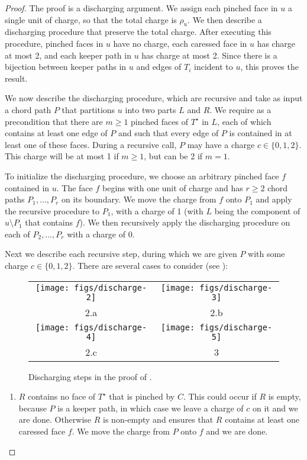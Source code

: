 \documentclass{patmorin}
\newcommand{\dual}[1]{{#1}^\star}
\begin{document}
\begin{proof}
   The proof is a discharging argument.  We assign each pinched face in 
   $u$ a single unit of charge, so that the total charge is $\rho_u$.
   We then describe a discharging procedure that preserve the total
   charge.  After executing this procedure, pinched faces in $u$
   have no charge, each caressed face in $u$ has charge at most 2,
   and each keeper path in $u$ has charge at most 2.  Since there is a
   bijection between keeper paths in $u$ and edges of $T_i$ incident to
   $u$, this proves the result.

   We now describe the discharging procedure, which are recursive and take as
   input a chord path $P$ that partitions $u$ into two parts $L$ and $R$.
   We require as a precondition that there are $m\ge 1$ pinched faces
   of $\dual{T}$ in $L$, each of which contains at least one edge of $P$ and
   such that every edge of $P$ is contained in at least one of these faces.
   During a recursive call, $P$ may have a charge $c\in\{0,1,2\}$. This
   charge will be at most 1 if $m\ge 1$, but can be 2 if $m=1$.

   To initialize the discharging procedure, we choose an arbitrary pinched
   face $f$ contained in $u$.  The face $f$ begins with one unit of charge
   and has $r\ge 2$ chord paths $P_1,\ldots,P_r$ on its boundary.
   We move the charge from $f$ onto $P_1$ and apply the recursive
   procedure to $P_1$, with a charge of 1 (with $L$ being the component
   of $u\setminus P_1$ that contains $f$).  We then recursively apply the
   discharging procedure on each of $P_2,\ldots,P_r$ with a charge of 0.

   Next we describe each recursive step, during which we are given $P$
   with some charge $c\in\{0,1,2\}$.  There are several cases to consider
   (see ):
	\begin{figure}
		\begin{center}
		\begin{tabular}{cc}
			\texttt{[image: figs/discharge-2]} &
			\texttt{[image: figs/discharge-3]} \\
			 2.a & 2.b \\[1.5em]
			\texttt{[image: figs/discharge-4]} &
			\texttt{[image: figs/discharge-5]} \\
			 2.c & 3 
		\end{tabular}
		\end{center}
		\caption{Discharging steps in the proof of .}
	\end{figure}
  \begin{enumerate}
     \item $R$ contains no face of $\dual{T}$ that is pinched by $C$.
     This could occur if $R$ is empty, because $P$ is a keeper path,
     in which case we leave a charge of $c$ on it and we are done.
     Otherwise $R$ is non-empty and   ensures that
     $R$ contains at least one caressed face $f$.  We move the charge
     from $P$ onto $f$ and we are done.


\end{enumerate}
\end{proof}
\end{document}
